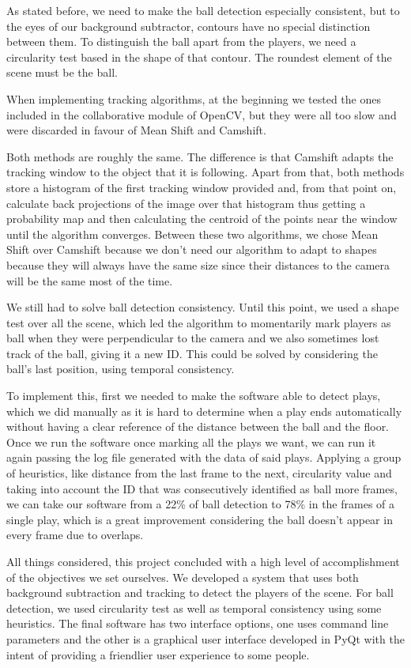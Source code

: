 As stated before, we need to make the ball detection especially consistent, but to the eyes of our background subtractor, contours have no special distinction between them. To distinguish the ball apart from the players, we need a circularity test based in the shape of that contour. The roundest element of the scene must be the ball.

When implementing tracking algorithms, at the beginning we tested the ones included in the collaborative module of OpenCV, but they were all too slow and were discarded in favour of Mean Shift and Camshift. 

Both methods are roughly the same. The difference is that Camshift adapts the tracking window to the object that it is following. Apart from that, both methods store a histogram of the first tracking window provided and, from that point on, calculate back projections of the image over that histogram thus getting a probability map and then calculating the centroid of the points near the window until the algorithm converges. Between these two algorithms, we chose Mean Shift over Camshift because we don’t need our algorithm to adapt to shapes because they will always have the same size since their distances to the camera will be the same most of the time.

We still had to solve ball detection consistency. Until this point, we used a shape test over all the scene, which led the algorithm to momentarily mark players as ball when they were perpendicular to the camera and we also sometimes lost track of the ball, giving it a new ID. This could be solved by considering the ball’s last position, using temporal consistency. 

To implement this, first we needed to make the software able to detect plays, which we did manually as it is hard to determine when a play ends automatically without having a clear reference of the distance between the ball and the floor. Once we run the software once marking all the plays we want, we can run it again passing the log file generated with the data of said plays. Applying a group of heuristics, like distance from the last frame to the next, circularity value and taking into account the ID that was consecutively identified as ball more frames, we can take our software from a 22\% of ball detection to 78\% in the frames of a single play, which is a great improvement considering the ball doesn’t appear in every frame due to overlaps.

All things considered, this project concluded with a high level of accomplishment of the objectives we set ourselves. We developed a system that uses both background subtraction and tracking to detect the players of the scene. For ball detection, we used circularity test as well as temporal consistency using some heuristics. The final software has two interface options, one uses command line parameters and the other is a graphical user interface developed in PyQt with the intent of providing a friendlier user experience to some people.

